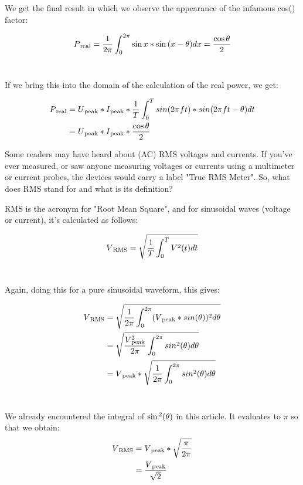 \documentclass[a4paper]{article}
\def\SP#1{\textsuperscript{#1}}
\def\SB#1{\textsubscript{{#1}}}
\def\SPSB#1#2{\rlap{\textsuperscript{#1}}\SB{#2}}
\begin{document}
We get the final result in which we observe the appearance of
the infamous cos(\phi) factor:\

\begin{align*}
  P\SB{real} &=\frac{1}{2 \pi}\int_0^{2\pi}\sin{x} * \sin{(x - \theta)}dx = \frac{\cos{\theta}}{2}\\
\end{align*}\

If we bring this into the domain of the calculation of the real power,
we get:\

\begin{align*}
  P\SB{real} &= U\SB{peak} * I\SB{peak} * \frac{1}{T} \int_0^{T}{sin(2\pi ft) * sin(2\pi ft - \theta)} dt\\
  &= U\SB{peak} * I\SB{peak} * \frac{\cos{\theta}}{2}\\
\end{align*}

Some readers may have heard about (AC) RMS voltages and currents. If
you've ever measured, or saw anyone measuring voltages or currents using a
multimeter or current probes, the devices would carry a label "True RMS
Meter". So, what does RMS stand for and what is its definition?

RMS is the acronym for "Root Mean Square",  and for sinusoidal waves (voltage
or current), it's calculated as follows:\

\begin{align*}
  V\SB{RMS} &= \sqrt{\frac{1}{T} \int_0^{T} V\SP{2}(t) dt}\\
\end{align*}\

Again, doing this for a pure sinusoidal waveform, this gives:

\begin{align*}
  V\SB{RMS} &= \sqrt{\frac{1}{2 \pi} \int_0^{2 \pi} (V\SB{peak} * sin(\theta))\SP{2} d\theta}\\
  &= \sqrt{\frac{V\SPSB{2}{peak}}{2 \pi} \int_0^{2 \pi} sin\SP{2}(\theta) d\theta}\\
  &= V\SB{peak} * \sqrt{\frac{1}{2 \pi} \int_0^{2 \pi} sin\SP{2}(\theta) d\theta}\\
\end{align*}\

We already encountered the integral of $\sin\SP{2}(\theta)$ in this article.
It evaluates to $\pi$ so that we obtain:\\

\begin{align*}
  V\SB{RMS} &= V\SB{peak} * \sqrt{\frac{\pi}{2 \pi}}\\
  &= \frac{V\SB{peak}}{\sqrt{2}}\\
\end{align*}\
\end{document}
